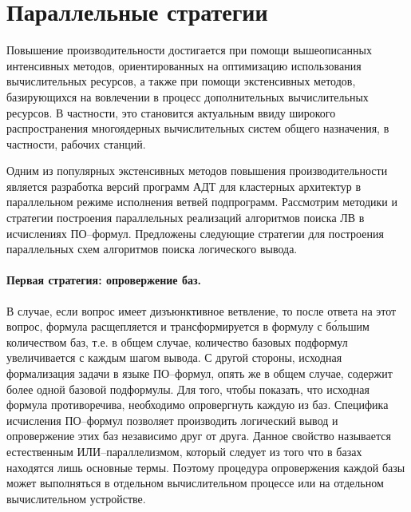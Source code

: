 \section{Параллельные стратегии}

Повышение производительности достигается при помощи вышеописанных интенсивных методов, ориентированных на оптимизацию использования вычислительных ресурсов, а также при помощи экстенсивных методов, базирующихся на вовлечении в процесс дополнительных вычислительных ресурсов. В частности, это становится актуальным ввиду широкого распространения многоядерных вычислительных систем общего назначения, в частности, рабочих станций.

Одним из популярных экстенсивных методов повышения производительности является разработка версий программ АДТ для кластерных архитектур в параллельном режиме исполнения ветвей подпрограмм. Рассмотрим методики и стратегии построения параллельных реализаций алгоритмов поиска ЛВ в исчислениях ПО--формул. Предложены следующие стратегии для построения параллельных схем алгоритмов поиска логического вывода.

\paragraph{Первая стратегия: опровержение баз.}

В случае, если вопрос имеет дизъюнктивное ветвление, то после ответа на этот вопрос, формула расщепляется и трансформируется в формулу с б\'{о}льшим количеством баз, т.е. в общем случае, количество базовых подформул увеличивается с каждым шагом вывода. С другой стороны, исходная формализация задачи в языке ПО--формул, опять же в общем случае, содержит более одной базовой подформулы. Для того, чтобы показать, что исходная формула противоречива, необходимо опровергнуть каждую из баз. Специфика исчисления ПО--формул позволяет производить логический вывод и опровержение этих баз независимо друг от друга. Данное свойство называется естественным ИЛИ--параллелизмом, который следует из того что в базах находятся лишь основные термы. Поэтому процедура опровержения каждой базы может выполняться в отдельном вычислительном процессе или на отдельном вычислительном устройстве.

